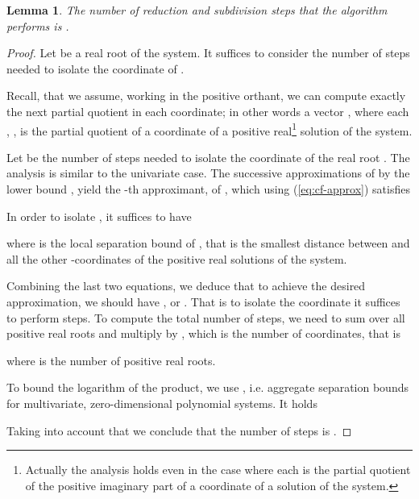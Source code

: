 \documentclass{sig-alternate}
\newtheorem{lemma}[theorem]{Lemma}
\begin{document}
\begin{lemma}
  \label{lem:mcf-steps}
  The number of reduction and subdivision steps 
  that the algorithm performs is .
\end{lemma}
\begin{proof}
  Let  be a real root of the system.
  It suffices to consider the number of steps needed to isolate
  the  coordinate of .

  Recall, that we assume, working in the positive orthant, 
  we can compute exactly the next partial quotient in each coordinate;
  in other words a vector , where each , 
  , is the partial quotient of a coordinate of a positive 
  real\footnote{Actually the analysis holds even in the
  case where each  is the partial quotient of the positive imaginary part of
  a coordinate of a solution of the system.} solution of the system.

  Let  be the number of steps needed to isolate the
   coordinate of the real root . 
  The analysis is similar to the univariate case.
  The successive approximations of
   by the lower bound ,
  yield  the -th approximant,
   of ,
  which using (\ref{eq:cf-approx}) satisfies
  

  In order to isolate , it suffices to have
  
  where  is the local separation bound of ,
  that is the smallest distance between  and all the other
  -coordinates of the positive real solutions of the system.

  Combining the last two equations, we deduce that
  to achieve the desired approximation, we should have 
  ,
  or  
  .
  That is to isolate the  coordinate it suffices to perform 
   steps.
  To compute the total number of steps, we need to sum over all positive real
  roots and multiply by , which is the number of coordinates,
  that is 
  
  where  is the number of positive real roots.


  To bound the logarithm of the product, we use  \cite{emt-dmm-2009},
  i.e. aggregate separation bounds for multivariate, zero-di\-men\-sion\-al polynomial
  systems. It holds 
  
  Taking into account that  we conclude that the number of steps 
  is .
\end{proof}
\end{document}
